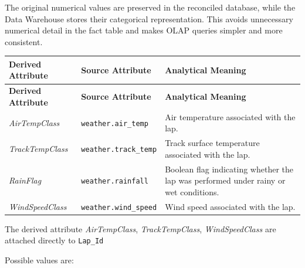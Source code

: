 \documentclass[a4paper,11pt]{article}
\begin{document}
	The original numerical values are preserved in the reconciled database, while the Data
	Warehouse stores their categorical representation. This avoids unnecessary numerical
	detail in the fact table and makes OLAP queries simpler and more consistent.
	
	
	\begin{longtable}{|p{4.2cm}|p{4.2cm}|p{6.2cm}|}
		\hline
		\textbf{Derived Attribute} & \textbf{Source Attribute} & \textbf{Analytical Meaning} \\
		\hline
		\endfirsthead
		
		\hline
		\textbf{Derived Attribute} & \textbf{Source Attribute} & \textbf{Analytical Meaning} \\
		\hline
		\endhead
		
		\textit{AirTempClass}
		& \texttt{weather.air\_temp}
		& Air temperature associated with the lap.  \\
		\hline
		
		\textit{TrackTempClass}
		& \texttt{weather.track\_temp}
		& Track surface temperature associated with the lap. \\
		\hline
		
		\textit{RainFlag}
		& \texttt{weather.rainfall}
		& Boolean flag indicating whether the lap was performed under rainy or wet conditions. \\
		\hline
		
		\textit{WindSpeedClass}
		& \texttt{weather.wind\_speed}
		& Wind speed associated with the lap. \\
		\hline
	\end{longtable}
	
	The derived attribute \textit{AirTempClass}, \textit{TrackTempClass}, \textit{WindSpeedClass} are attached directly to \texttt{Lap\_Id}
	
	Possible values are:
	
\end{document}
